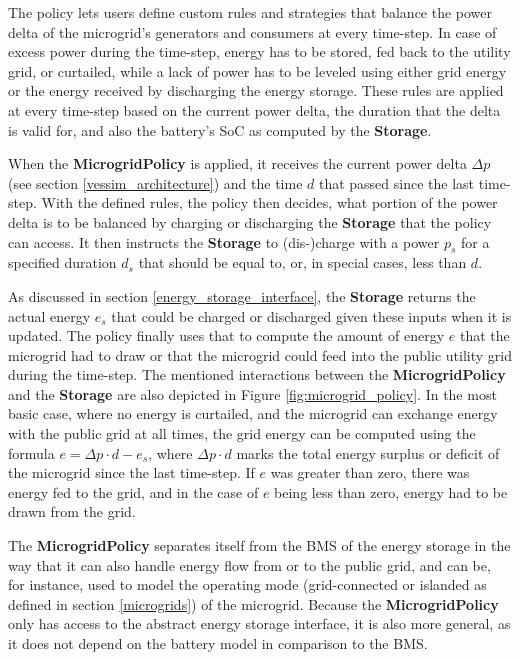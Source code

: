 The policy lets users define custom rules and strategies that balance the power delta of the microgrid's generators and consumers at every time-step. In case of excess power during the time-step, energy has to be stored, fed back to the utility grid, or curtailed, while a lack of power has to be leveled using either grid energy or the energy received by discharging the energy storage. These rules are applied at every time-step based on the current power delta, the duration that the delta is valid for, and also the battery's SoC as computed by the \textbf{Storage}.

When the \textbf{MicrogridPolicy} is applied, it receives the current power delta $\Delta p$ (see section \ref{vessim_architecture}) and the time $d$ that passed since the last time-step. With the defined rules, the policy then decides, what portion of the power delta is to be balanced by charging or discharging the \textbf{Storage} that the policy can access. It then instructs the \textbf{Storage} to (dis-)charge with a power $p_s$ for a specified duration $d_s$ that should be equal to, or, in special cases, less than $d$.

As discussed in section \ref{energy_storage_interface}, the \textbf{Storage} returns the actual energy $e_s$ that could be charged or discharged given these inputs when it is updated. The policy finally uses that to compute the amount of energy $e$ that the microgrid had to draw or that the microgrid could feed into the public utility grid during the time-step. The mentioned interactions between the \textbf{MicrogridPolicy} and the \textbf{Storage} are also depicted in Figure \ref{fig:microgrid_policy}. In the most basic case, where no energy is curtailed, and the microgrid can exchange energy with the public grid at all times, the grid energy can be computed using the formula $e = \Delta p \cdot d - e_s$, where $\Delta p \cdot d$ marks the total energy surplus or deficit of the microgrid since the last time-step. If $e$ was greater than zero, there was energy fed to the grid, and in the case of $e$ being less than zero, energy had to be drawn from the grid.

The \textbf{MicrogridPolicy} separates itself from the BMS of the energy storage in the way that it can also handle energy flow from or to the public grid, and can be, for instance, used to model the operating mode (grid-connected or islanded as defined in section \ref{microgrids}) of the microgrid. Because the \textbf{MicrogridPolicy} only has access to the abstract energy storage interface, it is also more general, as it does not depend on the battery model in comparison to the BMS.